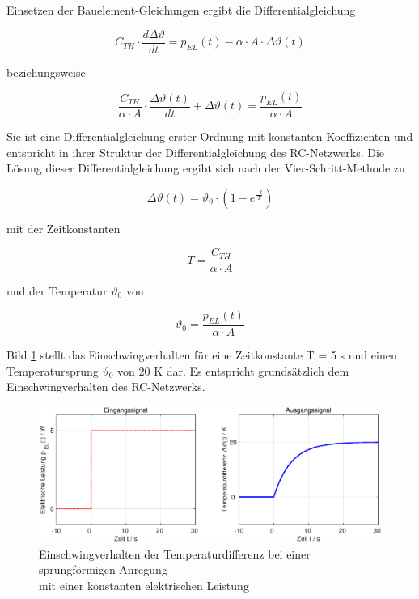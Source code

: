 \noindent Einsetzen der Bauelement-Gleichungen ergibt die Differentialgleichung

\begin{equation}\label{eq:threefiveteen}
C_{TH} \cdot \frac{d \Delta \vartheta}{dt}=p_{EL}(t) - \alpha\cdot A\cdot \Delta\vartheta(t)
\end{equation}

\noindent beziehungsweise

\begin{equation}\label{eq:threesixteen}
\frac{C_{TH}}{\alpha\cdot A} \cdot \frac{\Delta\vartheta(t)}{dt} + \Delta\vartheta(t) = \frac{p_{EL}(t)}{\alpha\cdot A}
\end{equation}

\noindent Sie ist eine Differentialgleichung erster Ordnung mit konstanten Koeffizienten und entspricht in ihrer Struktur der Differentialgleichung des RC-Netzwerks. Die Lösung dieser Differentialgleichung ergibt sich nach der Vier-Schritt-Methode zu

\begin{equation}\label{eq:threeseventeen}
 \Delta\vartheta(t) = \vartheta_{0}\cdot (1-e^{\frac{-t}{T}})
\end{equation}

\noindent mit der Zeitkonstanten

\begin{equation}\label{eq:threeeightteen}
T=\frac{C_{TH}}{\alpha\cdot A}
\end{equation}

\noindent und der Temperatur $\vartheta_{0}$ von

\begin{equation}\label{eq:threenineteen}
\vartheta_{0} = \frac{p_{EL}(t)}{\alpha\cdot A}
\end{equation}

\noindent Bild \ref{fig:TempEinschwingung} stellt das Einschwingverhalten für eine Zeitkonstante T = 5 s und einen Temperatursprung $\vartheta_{0}$ von 20 K dar. Es entspricht grundsätzlich dem Einschwingverhalten des RC-Netzwerks.

\begin{figure}[H]
  \centerline{\includegraphics[width=1\textwidth]{Kapitel2/Bilder/image5}}
  \caption{Einschwingverhalten der Temperaturdifferenz bei einer sprungförmigen Anregung\\ mit einer konstanten elektrischen Leistung
}
  \label{fig:TempEinschwingung}
\end{figure}

